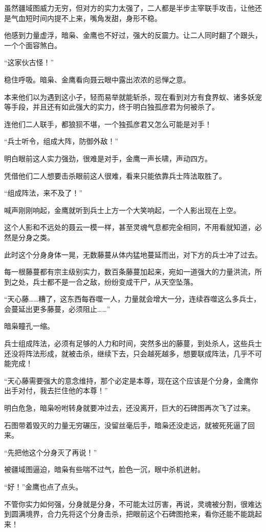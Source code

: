 \begin{this_body}
虽然疆域图威力无穷，但对方的实力太强了，二人都是半步主宰联手攻击，让他还是气血短时间内提不上来，嘴角发甜，身形不稳。

他感到力量虚浮，暗枭、金鹰也不好过，强大的反震力。让二人同时翻了个跟头，一个个面容煞白。

“这家伙古怪！”

稳住呼吸。暗枭、金鹰看向聂云眼中露出浓浓的忌惮之意。

本来他们以为遇到这小子，轻而易举就能斩杀，现在看到对方有食界蚁、诸多妖宠等手段，并且还有如此强大的实力，终于明白独孤彦君为何被杀了。

连他们二人联手，都狼狈不堪，一个独孤彦君又怎么可能是对手！

“兵士听令，组成大阵，防御外敌！”

明白眼前这人实力强劲，很难是对手，金鹰一声长啸，声动四方。

凭借他们二人想要击杀眼前这人很难，看来只能依靠兵士阵法取胜了。

“组成阵法，来不及了！”

喊声刚刚响起，金鹰就听到兵士上方一个大笑响起，一个人影出现在上空。

这个人影和不远处的聂云一模一样，甚至灵魂气息都完全相同，不用看就知道，必然是分身之类。

此时这个分身身体一晃，无数藤蔓从体内猛地蔓延而出，对下方的兵士冲了过去。

每一根藤蔓都有宗主级别实力，数百条藤蔓加起来，宛如一道强大的力量洪流，所到之处，兵士都不是一合之敌，纷纷变成干尸，从天空坠落。

“天心藤……糟了，这东西每吞噬一人，力量就会增大一分，连续吞噬这么多兵士，会蔓延出更多藤蔓，必须阻止……”

暗枭瞳孔一缩。

兵士组成阵法，必须有足够的人力和时间，突然多出的藤蔓，到处杀人，这些兵士还没将阵法形成，就被击杀，继续下去，只会越死越多，想要联成阵法，几乎不可能完成！

“天心藤需要强大的意念维持，那个必定是本尊，现在这个应该是个分身，金鹰你出手对付，我去拦住他的本尊！”

明白危急，暗枭吩咐转身就要冲过去，还没离开，巨大的石碑图再次飞了过来。

石图带着毁灭的力量无穷碾压，没留丝毫后手，暗枭还没走远，就被死死逼了回来。

“先把他这个分身灭了再说！”

被疆域图逼迫，暗枭有些喘不过气，脸色一沉，眼中杀机迸射。

“好！”金鹰也点了点头。

不管你实力如何强，分身就是分身，不可能太过厉害，再说，灵魂被分割，很难达到圆满境界，合力先将这个分身击杀，把眼前这个石碑图抢来，看你还能不能跳起来！


\end{this_body}
